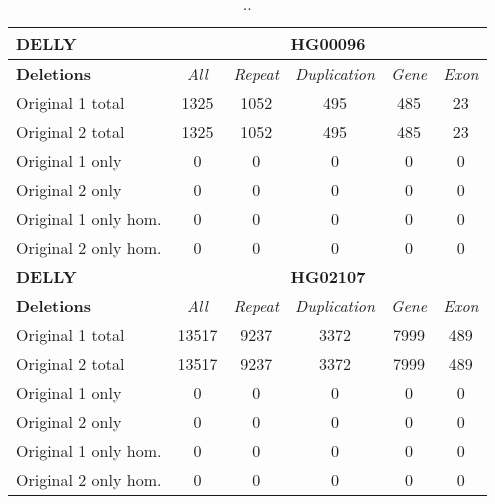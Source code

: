 \begin{table}[htb]
\caption{ .. }
\begin{center}
\begin{tabular}{|l|c||c|c|c|c|}
\hline
{\bf DELLY} & \multicolumn{5}{|c|}{\bf HG00096} \\
\hline
\cline{2-6}
{\bf Deletions} & {\it All} & {\it Repeat} & {\it Duplication} & {\it Gene} & {\it Exon} \\
\hline
Original 1 total & 1325 & 1052 & 495 & 485 & 23\\ 
\hline
Original 2 total & 1325 & 1052 & 495 & 485 & 23\\ 
\hline
Original 1 only & 0 & 0 & 0 & 0 & 0\\ 
\hline
Original 2 only & 0 & 0 & 0 & 0 & 0\\ 
\hline
Original 1 only hom. & 0 & 0 & 0 & 0 & 0\\ 
\hline
Original 2 only hom. & 0 & 0 & 0 & 0 & 0\\ 
\hline
\hline
{\bf DELLY} & \multicolumn{5}{|c|}{\bf HG02107} \\
\hline
\cline{2-6}
{\bf Deletions} & {\it All} & {\it Repeat} & {\it Duplication} & {\it Gene} & {\it Exon} \\
\hline
Original 1 total & 13517 & 9237 & 3372 & 7999 & 489\\ 
\hline
Original 2 total & 13517 & 9237 & 3372 & 7999 & 489\\ 
\hline
Original 1 only & 0 & 0 & 0 & 0 & 0\\ 
\hline
Original 2 only & 0 & 0 & 0 & 0 & 0\\ 
\hline
Original 1 only hom. & 0 & 0 & 0 & 0 & 0\\ 
\hline
Original 2 only hom. & 0 & 0 & 0 & 0 & 0\\ 
\hline
\end{tabular}
\end{center}
\label{tab:orig-vs-orig2-delly-deletions}
\end{table}

